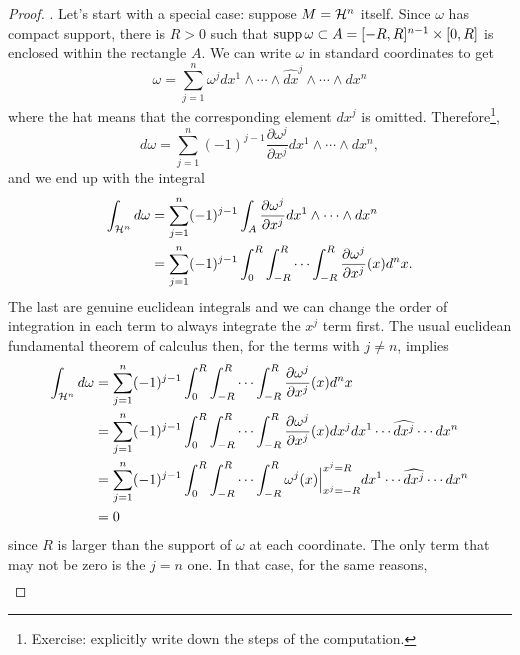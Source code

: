 \begin{proof}
  .
  Let's start with a special case: suppose $M = \mathcal{H}^n$ itself.
  Since $\omega$ has compact support, there is $R > 0$ such that $\operatorname{supp} \omega \subset A = [-R,R]^{n-1}\times[0,R]$ is enclosed within the rectangle $A$.
  We can write $\omega$ in standard coordinates to get
  \begin{equation}
    \omega = \sum_{j=1}^n \omega^j dx^1 \wedge \cdots\wedge \widehat{dx}^j \wedge \cdots\wedge dx^n
  \end{equation}
  where the hat means that the corresponding element $dx^j$ is omitted.
  Therefore\footnote{Exercise: explicitly write down the steps of the computation.},
  \begin{equation}
    d\omega = \sum_{j=1}^n (-1)^{j-1} \frac{\partial \omega^j}{\partial x^j}dx^1\wedge\cdots\wedge dx^n,
  \end{equation}
  and we end up with the integral
  \begin{align}
    \int_{\cH^n} d\omega
    &= \sum_{j=1}^n (-1)^{j-1} \int_A\frac{\partial \omega^j}{\partial x^j}dx^1\wedge\cdots\wedge dx^n \\
    &= \sum_{j=1}^n (-1)^{j-1} \int_0^R\int_{-R}^R\cdots\int_{-R}^{R}\frac{\partial \omega^j}{\partial x^j}(x) d^n x. %
  \end{align}
  The last are genuine euclidean integrals and we can change the order of integration in each term to always integrate the $x^j$ term first.
  The usual euclidean fundamental theorem of calculus then, for the terms with $j\neq n$, implies
  \begin{align}
    \int_{\cH^n} d\omega
    &= \sum_{j=1}^n (-1)^{j-1} \int_0^R\int_{-R}^R\cdots\int_{-R}^{R}\frac{\partial \omega^j}{\partial x^j}(x) d^n x \\ %
    &=\sum_{j=1}^n (-1)^{j-1} \int_0^R\int_{-R}^R\cdots\int_{-R}^{R}\frac{\partial \omega^j}{\partial x^j}(x) dx^j dx^1\cdots\widehat{dx^j}\cdots dx^n \\
    &=\sum_{j=1}^n (-1)^{j-1} \int_0^R\int_{-R}^R\cdots\int_{-R}^{R}\omega^j(x) \Big|_{x^j=-R}^{x^j=R} dx^1\cdots\widehat{dx^j}\cdots dx^n \\
    &= 0
  \end{align}
  since $R$ is larger than the support of $\omega$ at each coordinate.
  The only term that may not be zero is the $j=n$ one.
  In that case, for the same reasons,
  \begin{align}

\end{align}
\end{proof}

